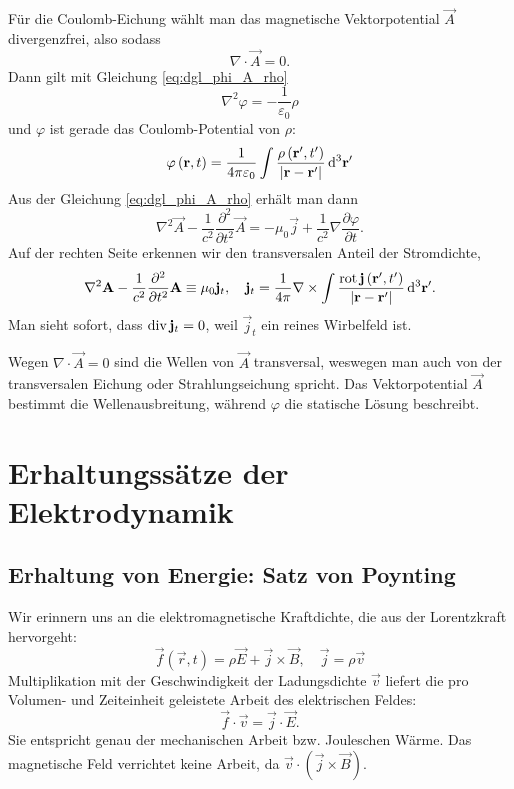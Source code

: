 Für die Coulomb-Eichung wählt man das magnetische Vektorpotential $\vec {A}$ divergenzfrei, also sodass
\begin{equation*}
	\nabla \cdot \vec {A}=0.
\end{equation*}
Dann gilt mit Gleichung \eqref{eq:dgl_phi_A_rho}
\begin{equation*}
	\nabla ^{2}\varphi =-\frac{1}{\varepsilon _{0}}\rho
\end{equation*}
und $\varphi $ ist gerade das Coulomb-Potential von $\rho $:
\begin{equation*}
	\varphi \left(\mathbf{r},t\right)=\frac{1}{4\pi \varepsilon _{0}}\int \frac{\rho \left(\mathbf{r}',t'\right)}{\left| \mathbf{r}-\mathbf{r}'\right| }\mathop{}\!\mathrm{d} ^{3}\mathbf{r}'
\end{equation*}
Aus der Gleichung \eqref{eq:dgl_phi_A_rho} erhält man dann
\begin{equation*}
	\nabla ^{2}\vec {A}-\frac{1}{c^{2}}\frac{\partial ^{2}}{\partial t^{2}}\vec {A}=-\mu _{0}\vec {j}+\frac{1}{c^{2}}\nabla \frac{\partial \varphi }{\partial t}.
\end{equation*}
Auf der rechten Seite erkennen wir den transversalen Anteil der Stromdichte,
\begin{equation*}
	\nabla ^{2}\mathbf{A}-\frac{1}{c^{2}}\frac{\partial ^{2}}{\partial t^{2}}\mathbf{A}\equiv\mu _{0}\mathbf{j}_{t},\quad \mathbf{j}_{t}=\frac{1}{4\pi }\nabla \times \int \frac{\operatorname{rot} \mathbf{j}\left(\mathbf{r}',t'\right)}{\left| \mathbf{r}-\mathbf{r}'\right| }\mathop{}\!\mathrm{d} ^{3}\mathbf{r}'.
\end{equation*}
Man sieht sofort, dass $\operatorname{div} \mathbf{j}_{t}=0$, weil $\vec {j}_{t}$ ein reines Wirbelfeld ist.

Wegen $\nabla \cdot \vec {A}=0$ sind die Wellen von $\vec {A}$ transversal, weswegen man auch von der transversalen Eichung oder Strahlungseichung spricht. Das Vektorpotential $\vec {A}$ bestimmt die Wellenausbreitung, während $\varphi $ die statische Lösung beschreibt.

\section{Erhaltungssätze der Elektrodynamik}

\subsection{Erhaltung von Energie: Satz von Poynting}

Wir erinnern uns an die elektromagnetische Kraftdichte, die aus der Lorentzkraft hervorgeht:
\begin{equation*}
	\vec {f}\left(\vec {r},t\right)=\rho \vec {E}+\vec {j}\times \vec {B},\quad \vec {j}=\rho \vec {v}
\end{equation*}
Multiplikation mit der Geschwindigkeit der Ladungsdichte $\vec {v}$ liefert die pro Volumen- und Zeiteinheit geleistete Arbeit des elektrischen Feldes:
\begin{equation*}
	\vec {f}\cdot \vec {v}=\vec {j}\cdot \vec {E}.
\end{equation*}
Sie entspricht genau der mechanischen Arbeit bzw. Jouleschen Wärme. Das magnetische Feld verrichtet keine Arbeit, da $\vec {v}\cdot \left(\vec {j}\times \vec {B}\right)$.

